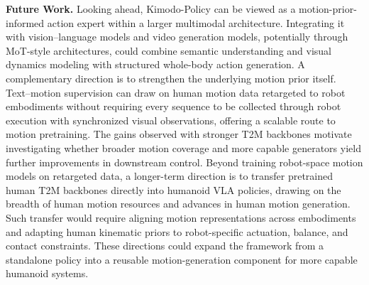 \textbf{Future Work.} Looking ahead, Kimodo-Policy can be viewed as a motion-prior-informed action expert within a larger multimodal architecture. Integrating it with vision–language models and video generation models, potentially through MoT-style architectures, could combine semantic understanding and visual dynamics modeling with structured whole-body action generation. A complementary direction is to strengthen the underlying motion prior itself. Text–motion supervision can draw on human motion data retargeted to robot embodiments without requiring every sequence to be collected through robot execution with synchronized visual observations, offering a scalable route to motion pretraining. The gains observed with stronger T2M backbones motivate investigating whether broader motion coverage and more capable generators yield further improvements in downstream control. Beyond training robot-space motion models on retargeted data, a longer-term direction is to transfer pretrained human T2M backbones directly into humanoid VLA policies, drawing on the breadth of human motion resources and advances in human motion generation. Such transfer would require aligning motion representations across embodiments and adapting human kinematic priors to robot-specific actuation, balance, and contact constraints. These directions could expand the framework from a standalone policy into a reusable motion-generation component for more capable humanoid systems.